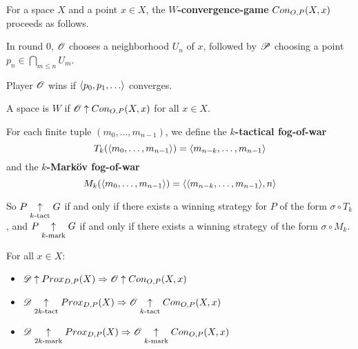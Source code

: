 \begin{definition}
  For a space $X$ and a point $x\in X$, the \textbf{$W$-convergence-game} $Con_{O,P}(X,x)$ proceeds as follows. 

  In round $0$, $\mathscr{O}$ chooses a neighborhood $U_n$ of $x$, followed by $\mathscr{P}$ choosing a point $p_n\in \bigcap_{m\leq n}U_m$.

  Player $\mathscr{O}$ wins if $\<p_0,p_1,\dots\>$ converges.
\end{definition}

\begin{definition}
  A space is \textbf{$W$} if $\mathscr{O} \uparrow Con_{O,P}(X,x)$ for all $x\in X$.
\end{definition}

\begin{definition}
  For each finite tuple $(m_0,\dots,m_{n-1})$, we define the \textbf{$k$-tactical fog-of-war}
    \[
      T_k(\langle m_0,\dots,m_{n-1}\rangle)=\langle m_{n-k},\dots,m_{n-1}\rangle
    \]
  and the \textbf{$k$-Mark\"ov fog-of-war}
    \[
      M_k(\langle m_0,\dots,m_{n-1}\rangle)=\langle\langle m_{n-k},\dots,m_{n-1}\rangle,n\rangle
    \]

  So $P\underset{k\text{-tact}}{\uparrow}G$ if and only if there exists a winning strategy for $P$ of the form $\sigma\circ T_k$, and $P\underset{k\text{-mark}}{\uparrow}G$ if and only if there exists a winning strategy of the form $\sigma\circ M_k$.
\end{definition}

\begin{theorem}
For all $x\in X$:
  \begin{itemize}
    \item
      $\mathscr{D}\uparrow Prox_{D,P}(X) \Rightarrow \mathscr{O} \uparrow Con_{O,P}(X,x)$
    \item
      $\mathscr{D}\underset{2k\text{-tact}}{\uparrow} Prox_{D,P}(X) \Rightarrow \mathscr{O} \underset{k\text{-tact}}{\uparrow} Con_{O,P}(X,x)$
    \item
      $\mathscr{D}\underset{2k\text{-mark}}{\uparrow} Prox_{D,P}(X) \Rightarrow \mathscr{O} \underset{k\text{-mark}}{\uparrow} Con_{O,P}(X,x)$
  \end{itemize}
\end{theorem}


